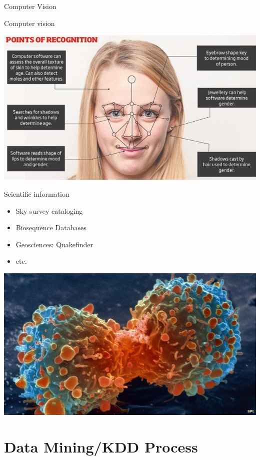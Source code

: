 \documentclass{beamer}
\begin{document}
\begin{frame}{Computer Vision}

Computer vision
  
\begin{center}
\includegraphics[width=.9\textwidth]{figs/FaceRecognition}
\end{center}

\end{frame}

\begin{frame}{Scientific information}

\begin{itemize}
 \item Sky survey cataloging
 \item Biosequence Databases
 \item Geosciences: Quakefinder
 \item etc.
\end{itemize}

\begin{center}
\includegraphics[width=.3\textwidth]{figs/bioinformatics}
\end{center}

\end{frame}


\section{Data Mining/KDD Process}
\end{document}
